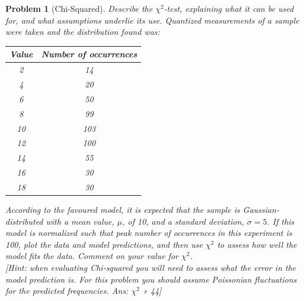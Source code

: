 \documentclass[a4paper]{article}
\theoremstyle{new}
\newtheorem{qns}{Problem}[section]
\begin{document}
\begin{qns}[Chi-Squared]
Describe the $\chi^2$-test, explaining what it can be used for, and what assumptions underlie its use. Quantized measurements of a sample were taken and the distribution found was:
\begin{center}
\begin{tabular}{|c|c|}
\hline
Value & Number of occurrences\\
\hline
2 & 14\\
4 & 20\\
6 & 50\\
8 & 99\\
10 & 103\\
12 & 100\\
14 & 55\\
16 & 30\\
18 & 30\\
\hline
\end{tabular}
\end{center}
According to the favoured model, it is expected that the sample is Gaussian-distributed with a mean value, $\mu$, of 10, and a standard deviation, $\sigma=5$. If this model is normalized such that peak number of occurrences in this experiment is 100, plot the data and model predictions, and then use $\chi^2$ to assess how well the model fits the data. Comment on your value for $\chi^2$.\\[5pt]
[Hint: when evaluating Chi-squared you will need to assess what the error in the model prediction is. For this problem you should assume Poissonian fluctuations for the predicted frequencies. Ans: $\chi^2$ » 44]
\end{qns}
\end{document}
